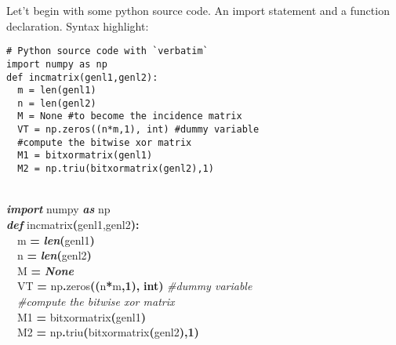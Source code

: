 \documentclass[12pt]{article}
\begin{document}
Let't begin with some python source code. An import statement and a function declaration. Syntax highlight:

\begin{verbatim}
# Python source code with `verbatim`
import numpy as np
def incmatrix(genl1,genl2):
  m = len(genl1)
  n = len(genl2)
  M = None #to become the incidence matrix
  VT = np.zeros((n*m,1), int) #dummy variable
  #compute the bitwise xor matrix
  M1 = bitxormatrix(genl1)
  M2 = np.triu(bitxormatrix(genl2),1)
\end{verbatim}


\begin{flushleft}
{}\\
\textbf{\textit{import}} numpy \textbf{\textit{as}} np\\
\textbf{\emph{def}} incmatrix\textbf{(}genl1,genl2\textbf{)}\textbf{:}\\
\ \ m \textbf{=} \textbf{\emph{len}}\textbf{(}genl1\textbf{)}\\
\ \ n \textbf{=} \textbf{\emph{len}}\textbf{(}genl2\textbf{)}\\
\ \ M \textbf{=} \textbf{\emph{None}} {}\\
\ \ VT \textbf{=} np\textbf{.}zeros\textbf{(}\textbf{(}n\textbf{*}m\textbf{,}\textbf{1}\textbf{)}\textbf{,} \textbf{int}\textbf{)} \textit{\color{gray}\#dummy variable}\\
\ \ \textit{\color{gray}\#compute the bitwise xor matrix}\\
\ \ M1 \textbf{=} bitxormatrix\textbf{(}genl1\textbf{)}\\
\ \ M2 \textbf{=} np\textbf{.}triu\textbf{(}bitxormatrix\textbf{(}genl2\textbf{)}\textbf{,}\textbf{1}\textbf{)}\\
\end{flushleft}
\end{document}
